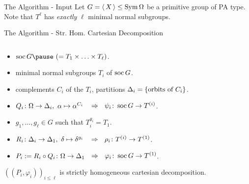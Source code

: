 \begin{frame}{The Algorithm - Input}
    \centering
    \large
    Let $G =  \left\langle \, X \, \right\rangle  \leq \operatorname{Sym} \Omega$ be a primitive group of PA type.
    \\[1em]
    \pause
    Note that $T ^ \ell$ has \emph{exactly} $\ell$ minimal normal subgroups.
\end{frame}


\begin{frame}{The Algorithm - Str. Hom. Cartesian Decomposition}
    \begin{alg}
        $~$
        \\[-1em]
        \begin{itemize}
            \item
            $\soc G \pause ~ (= T_1 \times \ldots \times T_\ell)$.
            \pause
            \item
            minimal normal subgroups $T_i$ of $\operatorname{soc} G$.
            \pause
            \item
            complements $C_i$ of the $T_i$,
            \pause
            partitions $\Delta_i =  \left\{  \text{orbits of } C_i  \right\} $.
            \pause
            \item
            $Q_i \colon \Omega \rightarrow \Delta_i,
            ~ \alpha \mapsto \alpha ^ {C_i}$
            \pause
            $~~\Rightarrow~~ \psi_i \colon \operatorname{soc} G \rightarrow T^{(i)}$.
            \pause
            \item
            $g_1, \ldots, g_\ell \in G$ such that $T_i ^ {g_i} = T_1$.
            \pause
            \item
            $R_i \colon \Delta_i \rightarrow \Delta_1,
            ~ \delta \mapsto \delta ^ {g_i}$
            \pause
            $~~\Rightarrow~~ \rho_i \colon T^{(i)} \rightarrow T ^ {(1)}$.
            \pause
            \item
            $P_i := R_i \circ Q_i \colon \Omega \rightarrow \Delta_1$
            \pause
            $\hspace{0.5em}\Rightarrow~~ \varphi_i \colon \operatorname{soc} G \rightarrow T ^ {(1)}$.
        \end{itemize}
    \end{alg}
    \pause

    $((P_i, \varphi_i))_{i \leq \ell}$
    is strictly homogeneous cartesian decomposition.
\end{frame}

